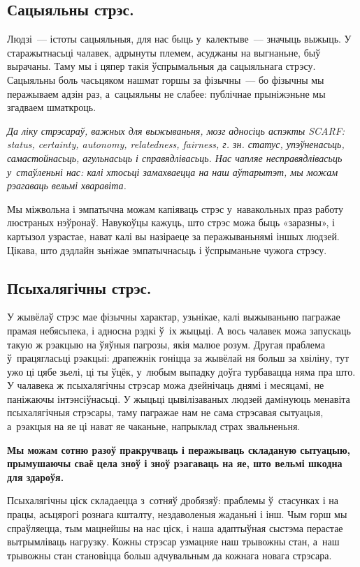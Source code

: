 \subsection*{Сацыяльны стрэс.}

Людзі~--- істоты сацыяльныя, для нас быць у~калектыве~--- значыць выжыць. У старажытнасьці чалавек, адрынуты племем, асуджаны на выгнаньне, быў вырачаны. Таму мы і цяпер такія ўспрымальныя да сацыяльнага стрэсу. Сацыяльны боль часьцяком нашмат горшы за фізычны~--- бо фізычны мы перажываем адзін раз, а~сацыяльны не слабее: публічнае прыніжэньне мы згадваем шматкроць.

\emph{Да ліку стрэсараў, важных для выжываньня, мозг адносіць аспэкты SCARF: status, certainty, autonomy, relatedness, fairness, г. зн. статус, упэўненасьць, самастойнасьць, агульнасьць і справядлівасьць. Нас чапляе несправядлівасьць у~стаўленьні нас: калі хтосьці замахваецца на наш аўтарытэт, мы можам рэагаваць вельмі хваравіта.}

Мы міжвольна і эмпатычна можам капіяваць стрэс у~навакольных праз работу люстраных нэўронаў. Навукоўцы кажуць, што стрэс можа быць «заразны», і картызол узрастае, нават калі вы назіраеце за перажываньнямі іншых людзей. Цікава, што дэдлайн зьніжае эмпатычнасьць і ўспрыманьне чужога стрэсу.

\subsection*{Псыхалягічны стрэс.}

У жывёлаў стрэс мае фізычны характар, узьнікае, калі выжываньню пагражае прамая небясьпека, і адносна рэдкі ў~іх жыцьці. А вось чалавек можа запускаць такую ж рэакцыю на ўяўныя пагрозы, якія малюе розум. Другая праблема ў~працягласьці рэакцыі: драпежнік гоніцца за жывёлай ня больш за хвіліну, тут ужо ці цябе зьелі, ці ты ўцёк, у~любым выпадку доўга турбавацца няма пра што. У чалавека ж псыхалягічны стрэсар можа дзейнічаць днямі і месяцамі, не паніжаючы інтэнсіўнасьці. У жыцьці цывілізаваных людзей дамінуюць менавіта псыхалягічныя стрэсары, таму пагражае нам не сама стрэсавая сытуацыя, а~рэакцыя на яе ці нават яе чаканьне, напрыклад страх звальненьня. 

\textbf{Мы можам сотню разоў пракручваць і перажываць складаную сытуацыю, прымушаючы сваё цела зноў і зноў рэагаваць на яе, што вельмі шкодна для здароўя.}

Псыхалягічны ціск складаецца з~сотняў дробязяў: праблемы ў~стасунках і на працы, асьцярогі рознага кшталту, нездаволеныя жаданьні і інш. Чым горш мы спраўляецца, тым мацнейшы на нас ціск, і наша адаптыўная сыстэма перастае вытрымліваць нагрузку. Кожны стрэсар узмацняе наш трывожны стан, а~наш трывожны стан становіцца больш адчувальным да кожнага новага стрэсара.

